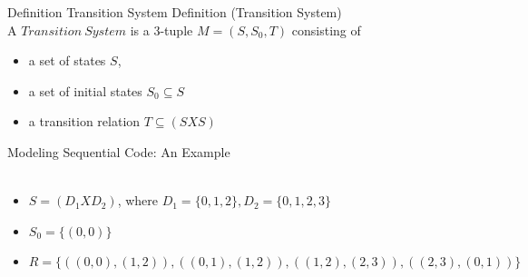 \documentclass{beamer}
\begin{document}
\begin{frame}{Definition Transition System}
Definition (Transition System) \\
A $Transition~System$ is a 3-tuple $M = (S, S_0, T)$ consisting of
\begin{itemize}
\item a set of states $S$,

\item a set of initial states $S_0 \subseteq S$\item a transition relation $T \subseteq (S X S)$
\end{itemize}
\end{frame}

\begin{frame}{Modeling Sequential Code: An Example}
\hfill
{} \\
 \\
\begin{itemize}
\item<3-> $S = (D_1 X D_2)$, where $D_1 = \{0,1,2\}, D_2 = \{0,1,2,3\}$
\item<3-> $S_0 = \{(0,0)\}$
\item<3-> $R = \{ ((0,0),(1,2)), ((0,1),(1,2)), ((1,2),(2,3)), ((2,3),(0,1))  \}$
\end{itemize}
\end{frame}
\end{document}
